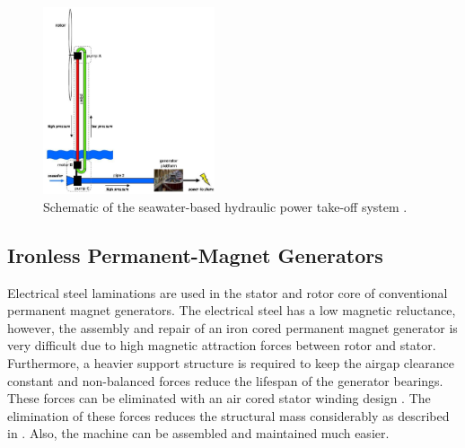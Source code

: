 \documentclass[a4paper, 11pt]{article} %
\begin{document}
  \begin{figure}[]
    \centering
    \includegraphics[width=0.45\textwidth]{we-at-sea}
    \caption{Schematic of the seawater-based hydraulic power take-off system  \cite{Diepeveen2004}.} 
    \label{we-at-sea}
  \end{figure}

\subsection{Ironless Permanent-Magnet Generators}

Electrical steel laminations are used in the stator and rotor core of conventional permanent magnet generators. The electrical steel has a low magnetic reluctance, however, the assembly and repair of an iron cored permanent magnet generator is very difficult due to high magnetic attraction forces between rotor and stator. Furthermore, a heavier support structure is required to keep the airgap clearance constant and non-balanced forces reduce the lifespan of the generator bearings. These forces can be eliminated with an air cored stator winding design \cite{Mueller2009}. The elimination of these forces reduces the structural mass considerably as described in \cite{McDonald2008b}. Also, the machine can be assembled and maintained much easier. 
\end{document}
